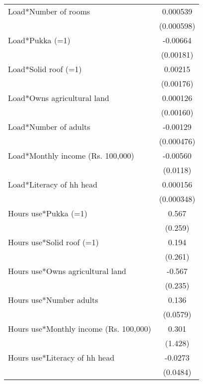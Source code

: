 \begin{table}[htbp]
{\begin{tabular}{l*{1}{c}}
Load*Number of rooms&    0.000539         \\
                    &  (0.000598)         \\

Load*Pukka (=1)     &    -0.00664\sym{***}\\
                    &   (0.00181)         \\

Load*Solid roof (=1)&     0.00215         \\
                    &   (0.00176)         \\

Load*Owns agricultural land&    0.000126         \\
                    &   (0.00160)         \\

Load*Number of adults&    -0.00129\sym{***}\\
                    &  (0.000476)         \\

Load*Monthly income (Rs. 100,000)&    -0.00560         \\
                    &    (0.0118)         \\

Load*Literacy of hh head&    0.000156         \\
                    &  (0.000348)         \\

Hours use*Pukka (=1)&       0.567\sym{**} \\
                    &     (0.259)         \\

Hours use*Solid roof (=1)&       0.194         \\
                    &     (0.261)         \\

Hours use*Owns agricultural land&      -0.567\sym{**} \\
                    &     (0.235)         \\

Hours use*Number adults&       0.136\sym{**} \\
                    &    (0.0579)         \\

Hours use*Monthly income (Rs. 100,000)&       0.301         \\
                    &     (1.428)         \\

Hours use*Literacy of hh head&     -0.0273         \\
                    &    (0.0484)         \\


\end{tabular}}
\end{table}
